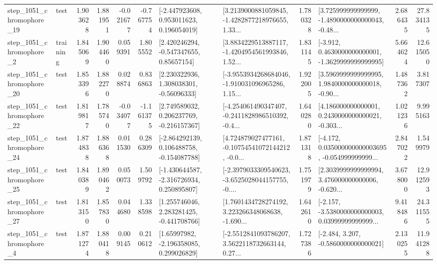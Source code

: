\begin{tabular}{llrrrrllrlrr}
 step\_1051\_chromophore\_19 &      test &      1.903628 &    1.881951 &     -0.021677 & -0.767754 &    [-2.447923608, 0.953011623, 0.196054019] &  [3.2139000881059845, -1.4282877218976655, 1.33... &       1.780328 &  [3.725999999999999, -1.4890000000000043, -0.48... &            2.686435 &         27.834135 \\
  step\_1051\_chromophore\_2 &  training &      1.845069 &    1.904460 &      0.059391 &  1.805552 &     [2.420246294, -0.547347655, 0.85657154] &  [3.8834229513887117, -1.4204954561993846, 1.52... &       1.831145 &  [-3.912, 0.4630000000000001, -1.3629999999999995] &            5.664624 &         12.615050 \\
 step\_1051\_chromophore\_20 &      test &      1.853396 &    1.882270 &      0.028874 &  0.836863 &     [2.230322936, 1.308038301, -0.56096333] &  [-3.9553934268684046, -1.910031096965286, 1.15... &       1.922005 &  [3.5969999999999995, 1.9840000000000018, -0.90... &            1.487362 &          3.817307 \\
 step\_1051\_chromophore\_22 &      test &      1.819817 &    1.785740 &     -0.034077 & -1.161375 &    [2.749589032, 0.206237769, -0.216157367] &  [-4.254061490347407, -0.2411828986510392, -0.4... &       1.640280 &  [4.186000000000001, 0.2430000000000021, -0.303... &            1.021236 &          9.995163 \\
 step\_1051\_chromophore\_24 &      test &      1.874838 &    1.886368 &      0.011530 &  0.286309 &   [-2.864292139, 0.106488758, -0.154087788] &  [4.724879027477161, -0.10754541072144212, -0.0... &       1.871318 &  [-4.172, 0.035000000000003695, -0.054999999999... &            2.847022 &          1.549979 \\
 step\_1051\_chromophore\_25 &      test &      1.840389 &    1.890462 &      0.050073 &  1.509792 &   [-1.430644587, -2.316726934, 0.250895807] &  [-2.3979033309540623, -3.6525028044157755, -0.... &       1.751979 &  [2.3039999999999994, 3.476000000000006, -0.620... &            3.678000 &         12.912593 \\
 step\_1051\_chromophore\_27 &      test &      1.813150 &    1.857830 &      0.044680 &  1.338598 &    [1.255746046, 2.283281425, -0.441708766] &  [1.7601434728274192, 3.223266348068638, -1.690... &       1.642610 &  [-2.157, -3.5380000000000003, 0.03999999999999... &            9.418486 &         24.311555 \\
  step\_1051\_chromophore\_4 &      test &      1.871274 &    1.880418 &      0.009145 &  0.210612 &     [1.65997982, -2.196358085, 0.299026829] &  [-2.5512841093786207, 3.5622118732663144, 0.27... &       1.727386 &               [-2.484, 3.207, -0.5860000000000021] &            2.130255 &         11.941288 \\

\end{tabular}
